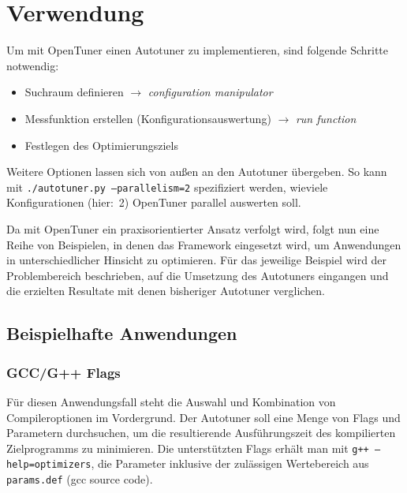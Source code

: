 \documentclass[a4paper,11pt]{scrartcl}
\begin{document}
\section{Verwendung}
Um mit OpenTuner einen Autotuner zu implementieren, sind folgende Schritte notwendig:
\begin{itemize}
  \item Suchraum definieren $\rightarrow$ \emph{configuration manipulator}
  \item Messfunktion erstellen (Konfigurationsauswertung) $\rightarrow$ \emph{run function}
  \item Festlegen des Optimierungsziels
\end{itemize}
Weitere Optionen lassen sich von außen an den Autotuner übergeben. So kann 
mit \texttt{./autotuner.py --parallelism=2} spezifiziert werden, wieviele Konfigurationen
(hier:~2) OpenTuner parallel auswerten soll. \newline

Da mit OpenTuner ein praxisorientierter Ansatz verfolgt wird, folgt nun eine Reihe von
Beispielen, in denen das Framework eingesetzt wird, um Anwendungen in unterschiedlicher 
Hinsicht zu optimieren. Für das jeweilige Beispiel wird der Problembereich beschrieben,
auf die Umsetzung des Autotuners eingangen und die erzielten Resultate mit denen bisheriger
Autotuner verglichen.

\subsection{Beispielhafte Anwendungen}
\subsubsection{GCC/G++ Flags}
Für diesen Anwendungsfall steht die Auswahl und Kombination von Compileroptionen
im Vordergrund. Der Autotuner soll eine Menge von Flags und Parametern durchsuchen,
um die resultierende Ausführungszeit des kompilierten Zielprogramms zu minimieren.
Die unterstützten Flags erhält man mit \texttt{g++ --help=optimizers}, die 
Parameter inklusive der zulässigen Wertebereich aus \texttt{params.def} (gcc source code). \newline
\end{document}
